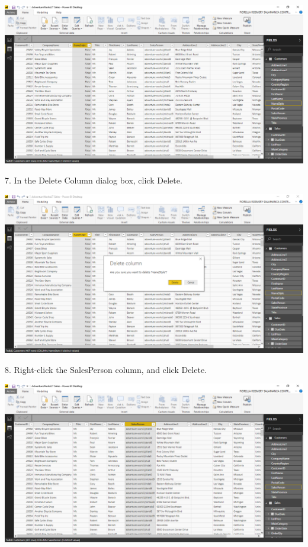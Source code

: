 	\begin{center}
	\includegraphics[width=17cm]{./Imagenes/Ejercicio1/Tarea3/3}
	\end{center}	

7. In the Delete Column dialog box, click Delete.\\

	\begin{center}
	\includegraphics[width=17cm]{./Imagenes/Ejercicio1/Tarea3/4}
	\end{center}	

8. Right-click the SalesPerson column, and click Delete.\\

	\begin{center}
	\includegraphics[width=17cm]{./Imagenes/Ejercicio1/Tarea3/5}
	\end{center}	

